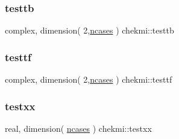\mbox{\label{namespacechekmi_a47fa67597e3879f8b3b9c044b05a6dc8}} 
\subsubsection{\texorpdfstring{testtb}{testtb}}
{\footnotesize\ttfamily complex, dimension( 2,\hyperlink{namespacechekmi_a7a072a81d4a96e7c6d537baf67910952}{ncases} ) chekmi\+::testtb}

\mbox{\label{namespacechekmi_a843b213251154034283b51b4c315cfdd}} 
\subsubsection{\texorpdfstring{testtf}{testtf}}
{\footnotesize\ttfamily complex, dimension( 2,\hyperlink{namespacechekmi_a7a072a81d4a96e7c6d537baf67910952}{ncases} ) chekmi\+::testtf}

\mbox{\label{namespacechekmi_a5a77a3570f10bdc7c249a1f737874688}} 
\subsubsection{\texorpdfstring{testxx}{testxx}}
{\footnotesize\ttfamily real, dimension( \hyperlink{namespacechekmi_a7a072a81d4a96e7c6d537baf67910952}{ncases} ) chekmi\+::testxx}

